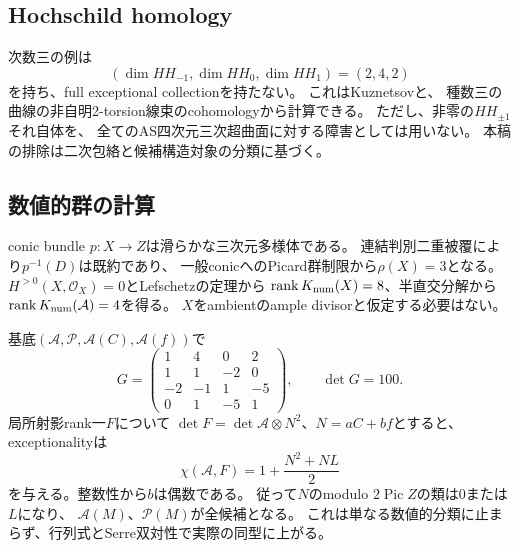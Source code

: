 \documentclass[11pt,a4paper]{ltjsarticle}
\begin{document}
\subsection{Hochschild homology}
次数三の例は
\[
(\dim HH_{-1},\dim HH_0,\dim HH_1)=(2,4,2)
\]
を持ち、full exceptional collectionを持たない。
これはKuznetsov\cite[Theorem~8.12]{KuznetsovHH}と、
種数三の曲線の非自明2-torsion線束のcohomologyから計算できる。
ただし、非零の$HH_{\pm1}$それ自体を、
全てのAS四次元三次超曲面に対する障害としては用いない。
本稿の排除は二次包絡と候補構造対象の分類に基づく。

\subsection{数値的群の計算}
conic bundle $p:X\to Z$は滑らかな三次元多様体である。
連結判別二重被覆により$p^{-1}(D)$は既約であり、
一般conicへのPicard群制限から$\rho(X)=3$となる。
$H^{>0}(X,\mathcal O_X)=0$とLefschetzの定理から
$\operatorname{rank} K_{\mathrm{num}}(X)=8$、半直交分解から
$\operatorname{rank} K_{\mathrm{num}}(\mathcal A)=4$を得る。
$X$をambientのample divisorと仮定する必要はない。

基底$(\mathcal A,\mathcal P,\mathcal A(C),\mathcal A(f))$で
\[
G=\begin{pmatrix}
1&4&0&2\\1&1&-2&0\\-2&-1&1&-5\\0&1&-5&1
\end{pmatrix},\qquad\det G=100.
\]
局所射影rank一$F$について
$\det F=\det\mathcal A\otimes N^2$、$N=aC+bf$とすると、
exceptionalityは
\[
\chi(\mathcal A,F)=1+\frac{N^2+NL}{2}
\]
を与える。整数性から$b$は偶数である。
従って$N$のmodulo $2\operatorname{Pic}Z$の類は$0$または$L$になり、
$\mathcal A(M)$、$\mathcal P(M)$が全候補となる。
これは単なる数値的分類に止まらず、行列式とSerre双対性で実際の同型に上がる。
\end{document}
